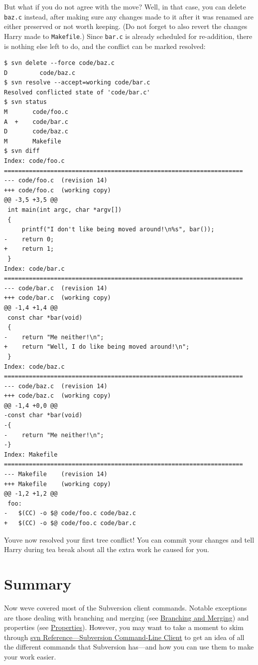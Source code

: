 But what if you do not agree with the move? Well, in that case, you can
delete \texttt{baz.c} instead, after making sure any changes made to it
after it was renamed are either preserved or not worth keeping. (Do not
forget to also revert the changes Harry made to \texttt{Makefile}.)
Since \texttt{bar.c} is already scheduled for re-addition, there is
nothing else left to do, and the conflict can be marked resolved:

\begin{verbatim}
$ svn delete --force code/baz.c
D         code/baz.c
$ svn resolve --accept=working code/bar.c
Resolved conflicted state of 'code/bar.c'
$ svn status
M       code/foo.c
A  +    code/bar.c
D       code/baz.c
M       Makefile
$ svn diff
Index: code/foo.c
===================================================================
--- code/foo.c  (revision 14)
+++ code/foo.c  (working copy)
@@ -3,5 +3,5 @@
 int main(int argc, char *argv[])
 {
     printf("I don't like being moved around!\n%s", bar());
-    return 0;
+    return 1;
 }
Index: code/bar.c
===================================================================
--- code/bar.c  (revision 14)
+++ code/bar.c  (working copy)
@@ -1,4 +1,4 @@
 const char *bar(void)
 {
-    return "Me neither!\n";
+    return "Well, I do like being moved around!\n";
 }
Index: code/baz.c
===================================================================
--- code/baz.c  (revision 14)
+++ code/baz.c  (working copy)
@@ -1,4 +0,0 @@
-const char *bar(void)
-{
-    return "Me neither!\n";
-}
Index: Makefile
===================================================================
--- Makefile    (revision 14)
+++ Makefile    (working copy)
@@ -1,2 +1,2 @@
 foo: 
-   $(CC) -o $@ code/foo.c code/baz.c
+   $(CC) -o $@ code/foo.c code/bar.c
\end{verbatim}

You\textquotesingle ve now resolved your first tree conflict! You can
commit your changes and tell Harry during tea break about all the extra
work he caused for you.

\section{Summary}\label{svn.tour.summary}

Now we\textquotesingle ve covered most of the Subversion client
commands. Notable exceptions are those dealing with branching and
merging (see \hyperref[svn.branchmerge]{Branching and Merging}) and
properties (see \hyperref[svn.advanced.props]{Properties}). However, you
may want to take a moment to skim through \hyperref[svn.ref.svn]{svn
Reference---Subversion Command-Line Client} to get an idea of all the
different commands that Subversion has---and how you can use them to
make your work easier.

